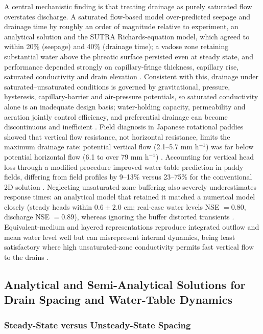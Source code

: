 A central mechanistic finding is that treating drainage as purely saturated flow overstates discharge. A saturated flow-based model over-predicted seepage and drainage time by roughly an order of magnitude relative to experiment, an analytical solution and the SUTRA Richards-equation model, which agreed to within 20\% (seepage) and 40\% (drainage time); a vadose zone retaining substantial water above the phreatic surface persisted even at steady state, and performance depended strongly on capillary-fringe thickness, capillary rise, saturated conductivity and drain elevation \parencite{Xin2016b}. Consistent with this, drainage under saturated--unsaturated conditions is governed by gravitational, pressure, hysteresis, capillary-barrier and air-pressure potentials, so saturated conductivity alone is an inadequate design basis; water-holding capacity, permeability and aeration jointly control efficiency, and preferential drainage can become discontinuous and inefficient \parencite{Li2021}. Field diagnosis in Japanese rotational paddies showed that vertical flow resistance, not horizontal resistance, limits the maximum drainage rate: potential vertical flow (2.1--5.7 mm h$^{-1}$) was far below potential horizontal flow (6.1 to over 79 mm h$^{-1}$) \parencite{Nishida2020}. Accounting for vertical head loss through a modified procedure improved water-table prediction in paddy fields, differing from field profiles by 9--13\% versus 23--75\% for the conventional 2D solution \parencite{Talukolaee2022}. Neglecting unsaturated-zone buffering also severely underestimates response times: an analytical model that retained it matched a numerical model closely (steady heads within $0.6\pm2.0$ cm; real-case water levels NSE $=0.80$, discharge NSE $=0.89$), whereas ignoring the buffer distorted transients \parencite{VandeCraats2021}. Equivalent-medium and layered representations reproduce integrated outflow and mean water level well but can misrepresent internal dynamics, being least satisfactory where high unsaturated-zone conductivity permits fast vertical flow to the drains \parencite{Carlier2007}.

\subsection{Analytical and Semi-Analytical Solutions for Drain Spacing and Water-Table Dynamics}

\subsubsection{Steady-State versus Unsteady-State Spacing}

